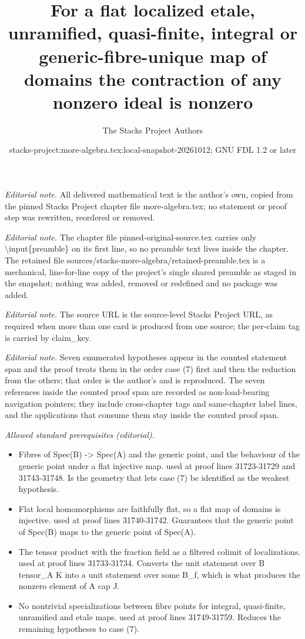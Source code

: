 \documentclass[10pt,a4paper]{amsart}
\title{For a flat localized etale, unramified, quasi-finite, integral or generic-fibre-unique map of domains the contraction of any nonzero ideal is nonzero}
\author{The Stacks Project Authors}
\date{stacks-project:more-algebra.tex:local-snapshot-20261012; GNU FDL 1.2 or later}
\theoremstyle{plain}
\theoremstyle{definition}
\theoremstyle{remark}
\numberwithin{equation}{subsection}
\begin{document}
\maketitle
\setcounter{subsection}{1}
\noindent\textit{Editorial note.} All delivered mathematical text is the author's own, copied from the pinned Stacks Project chapter file more-algebra.tex; no statement or proof step was rewritten, reordered or removed.\par\medskip
\noindent\textit{Editorial note.} The chapter file pinned-original-source.tex carries only \textbackslash{}input\{preamble\} on its first line, so no preamble text lives inside the chapter. The retained file sources/stacks-more-algebra/retained-preamble.tex is a mechanical, line-for-line copy of the project's single shared preamble as staged in the snapshot; nothing was added, removed or redefined and no package was added.\par\medskip
\noindent\textit{Editorial note.} The source URL is the source-level Stacks Project URL, as required when more than one card is produced from one source; the per-claim tag is carried by claim\_key.\par\medskip
\noindent\textit{Editorial note.} Seven enumerated hypotheses appear in the counted statement span and the proof treats them in the order case (7) first and then the reduction from the others; that order is the author's and is reproduced. The seven references inside the counted proof span are recorded as non-load-bearing navigation pointers; they include cross-chapter tags and same-chapter label lines, and the applications that consume them stay inside the counted proof span.\par\medskip
\noindent\textit{Allowed standard prerequisites (editorial).}\begin{itemize}
\item Fibres of Spec(B) -> Spec(A) and the generic point, and the behaviour of the generic point under a flat injective map. used at proof lines 31723-31729 and 31743-31748. Is the geometry that lets case (7) be identified as the weakest hypothesis.
\item Flat local homomorphisms are faithfully flat, so a flat map of domains is injective. used at proof lines 31740-31742. Guarantees that the generic point of Spec(B) maps to the generic point of Spec(A).
\item The tensor product with the fraction field as a filtered colimit of localizations. used at proof lines 31733-31734. Converts the unit statement over B tensor\_A K into a unit statement over some B\_f, which is what produces the nonzero element of A cap J.
\item No nontrivial specializations between fibre points for integral, quasi-finite, unramified and etale maps. used at proof lines 31749-31759. Reduces the remaining hypotheses to case (7).
\end{itemize}\medskip
\end{document}

